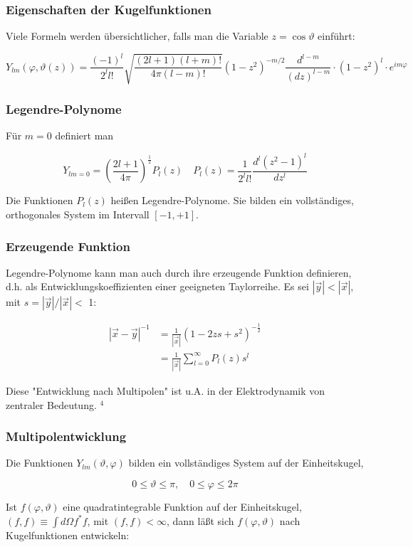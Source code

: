 \documentclass[10pt, letterpaper]{article}
\begin{document}
\subsubsection*{Eigenschaften der Kugelfunktionen}
Viele Formeln werden übersichtlicher, falls man die Variable $z=\cos \vartheta$ einführt:

$$
Y_{l m}(\varphi, \vartheta(z))=\frac{(-1)^{l}}{2^{l} l!} \sqrt{\frac{(2 l+1)(l+m)!}{4 \pi(l-m)!}}\left(1-z^{2}\right)^{-m / 2} \frac{d^{l-m}}{(d z)^{l-m}} \cdot\left(1-z^{2}\right)^{l} \cdot e^{i m \varphi}
$$

\subsubsection*{Legendre-Polynome}
Für $m=0$ definiert man

$$
Y_{l m=0}=\left(\frac{2 l+1}{4 \pi}\right)^{\frac{1}{2}} P_{l}(z) \quad P_{l}(z)=\frac{1}{2^{l} l!} \frac{d^{l}\left(z^{2}-1\right)^{l}}{d z^{l}}
$$

Die Funktionen $P_{l}(z)$ heißen Legendre-Polynome. Sie bilden ein vollständiges, orthogonales System im Intervall $[-1,+1]$.

\subsubsection*{Erzeugende Funktion}
Legendre-Polynome kann man auch durch ihre erzeugende Funktion definieren, d.h. als Entwicklungskoeffizienten einer geeigneten Taylorreihe. Es sei $|\vec{y}|<|\vec{x}|$, mit $s=|\vec{y}| /|\vec{x}|<$ 1:

$$
\begin{aligned}
|\vec{x}-\vec{y}|^{-1} & =\frac{1}{|\vec{x}|}\left(1-2 z s+s^{2}\right)^{-\frac{1}{2}} \\
& =\frac{1}{|\vec{x}|} \sum_{l=0}^{\infty} P_{l}(z) s^{l}
\end{aligned}
$$

Diese "Entwicklung nach Multipolen" ist u.A. in der Elektrodynamik von zentraler Bedeutung. ${ }^{4}$

\subsubsection*{Multipolentwicklung}
Die Funktionen $Y_{l m}(\vartheta, \varphi)$ bilden ein vollständiges System auf der Einheitskugel,

$$
0 \leq \vartheta \leq \pi, \quad 0 \leq \varphi \leq 2 \pi
$$

Ist $f(\varphi, \vartheta)$ eine quadratintegrable Funktion auf der Einheitskugel, $(f, f) \equiv \int d \Omega f^{*} f$, mit $(f, f)<\infty$, dann läßt sich $f(\varphi, \vartheta)$ nach Kugelfunktionen entwickeln:
\end{document}
